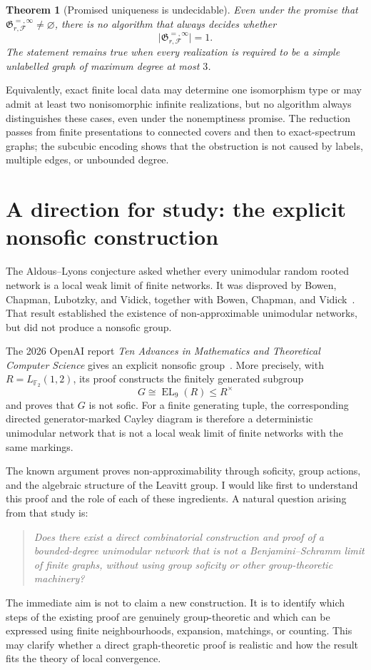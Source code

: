 \documentclass[10pt]{article}
\newcommand{\Gspace}{\mathfrak G}
\newtheorem{theorem}{Theorem}
\begin{document}
\begin{theorem}[Promised uniqueness is undecidable]
Even under the promise that
$\Gspace_{r,\mathcal F}^{=,\infty}\neq\varnothing$, there is no algorithm that
always decides whether
\[
  \bigl|\Gspace_{r,\mathcal F}^{=,\infty}\bigr|=1.
\]
The statement remains true when every realization is required to be a simple
unlabelled graph of maximum degree at most $3$.
\end{theorem}

Equivalently, exact finite local data may determine one isomorphism type or may admit
at least two nonisomorphic infinite realizations, but no algorithm always distinguishes
these cases, even under the nonemptiness promise.  The reduction passes from finite
presentations to connected covers and then to exact-spectrum graphs; the subcubic
encoding shows that the obstruction is not caused by labels, multiple edges, or
unbounded degree.

\section{A direction for study: the explicit nonsofic construction}

The Aldous--Lyons conjecture asked whether every unimodular random rooted network is
a local weak limit of finite networks.  It was disproved by Bowen, Chapman, Lubotzky,
and Vidick, together with Bowen, Chapman, and Vidick~\cite{BCLV,BCV}.  That result
established the existence of non-approximable unimodular networks, but did not produce
a nonsofic group.

The 2026 OpenAI report \emph{Ten Advances in Mathematics and Theoretical Computer
Science} gives an explicit nonsofic group~\cite{OAI}.  More precisely, with
$R=L_{\mathbb F_2}(1,2)$, its proof constructs the finitely generated subgroup
\[
  G\cong \operatorname{EL}_9(R)\leq R^{\times}
\]
and proves that $G$ is not sofic.  For a finite generating tuple, the corresponding
directed generator-marked Cayley diagram is therefore a deterministic unimodular
network that is not a local weak limit of finite networks with the same markings.

The known argument proves non-approximability through soficity, group actions, and the
algebraic structure of the Leavitt group.  I would like first to understand this proof
and the role of each of these ingredients.  A natural question arising from that study
is:
\begin{quote}
\emph{Does there exist a direct combinatorial construction and proof of a
bounded-degree unimodular network that is not a Benjamini--Schramm limit of finite
graphs, without using group soficity or other group-theoretic machinery?}
\end{quote}
The immediate aim is not to claim a new construction.  It is to identify which steps
of the existing proof are genuinely group-theoretic and which can be expressed using
finite neighbourhoods, expansion, matchings, or counting.  This may clarify whether a
direct graph-theoretic proof is realistic and how the result fits the theory of local
convergence.
\end{document}
